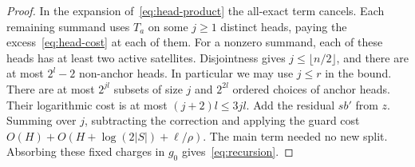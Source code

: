\begin{proof}
In the expansion of~\eqref{eq:head-product} the all-exact term cancels.
Each remaining summand uses \(T_a\) on some \(j\ge1\) distinct heads,
paying the excess~\eqref{eq:head-cost} at each of them. For a nonzero
summand, each of these heads has at least two active satellites.
Disjointness gives \(j\le\lfloor n/2\rfloor\), and there are at most
\(2^l-2\) non-anchor heads. In particular we may use \(j\le r\) in
the bound. There are at most \(2^{jl}\) subsets of size \(j\) and
\(2^{2l}\) ordered choices of anchor heads. Their logarithmic cost is
at most \((j+2)l\le3jl\). Add the residual \(s b'\) from \(z\).
Summing over \(j\), subtracting the correction and applying the guard
cost \(O(H)+O(H+\log(2|S|)+\ell/\rho)\). The main term needed no new
split. Absorbing these fixed charges in \(g_0\) gives~\eqref{eq:recursion}.
\end{proof}
